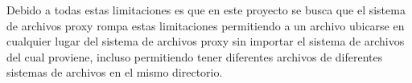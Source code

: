 Debido a todas estas limitaciones es que en este proyecto se busca que el sistema de archivos proxy rompa estas limitaciones permitiendo a un archivo ubicarse en cualquier lugar del sistema de archivos proxy sin importar el sistema de archivos del cual proviene, incluso permitiendo tener diferentes archivos de diferentes sistemas de archivos en el mismo directorio.



